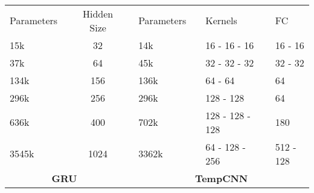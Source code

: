 \documentclass[runningheads]{llncs}
\begin{document}
\begin{table}[]
\begin{tabular}{lcccccccl}
\end{tabular}
\\~\\~\\
\centering
\begin{tabular}{lccclclcl}
Parameters &\phantom{ab}& Hidden Size & \phantom{abcdef} & Parameters & \phantom{ab}&Kernels &\phantom{ab}& FC \\\cmidrule{1-3} \cmidrule{5-9} 
15k   && 32   && 14k   && 16 -  16 -  16    && 16 -  16   \\
37k   && 64   && 45k   && 32 -  32 -  32    && 32 -  32   \\
134k  && 156  && 136k  && 64 -  64          && 64         \\
296k  && 256  && 296k  && 128 -  128        && 64         \\
636k  && 400  && 702k  && 128 -  128 -  128 && 180        \\
3545k && 1024 && 3362k && 64 -  128 -  256  && 512 -  128 \\ \cmidrule{1-3} \cmidrule{5-9} 
\multicolumn{3}{c}{\textbf{GRU}} & & \multicolumn{5}{c}{\textbf{TempCNN}}
\end{tabular}
\end{table} \FloatBarrier


\end{document}
